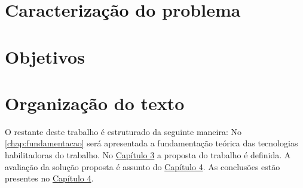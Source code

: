 \section{Caracterização do problema}


\section{Objetivos}


\section{Organização do texto}

O restante deste trabalho é estruturado da seguinte maneira: No \autoref{chap:fundamentacao} será apresentada a fundamentação teórica das tecnologias habilitadoras do trabalho. No \underline{Capítulo 3} a proposta do trabalho é definida. A avaliação da solução proposta é assunto do \underline{Capítulo 4}. As conclusões estão presentes no \underline{Capítulo 4}.

